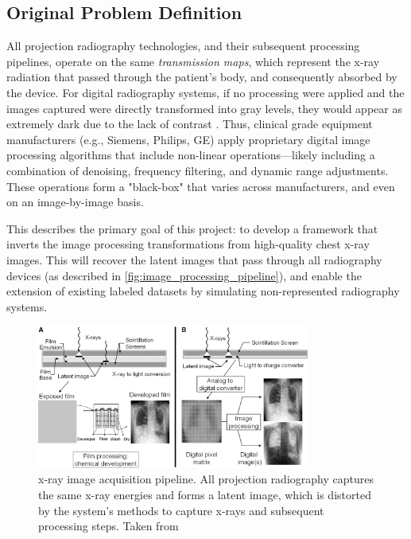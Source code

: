 \documentclass[nomenclature, english, bibtex]{kththesis}
\numberwithin{listing}{chapter}
\begin{document}
\subsection{Original Problem Definition}

All projection radiography technologies, and their subsequent processing pipelines, operate on the same
\textit{transmission maps}, which represent the x-ray radiation that passed through the patient's body, and consequently
absorbed by the device. For digital radiography systems, if no processing were applied and the images captured were directly transformed
into gray levels, they would appear as extremely dark due to the lack of contrast \cite[p.~148]{Prokop2003}.
Thus, clinical grade equipment manufacturers (e.g., Siemens, Philips, GE) apply proprietary digital image processing
algorithms that include non-linear operations—likely including a combination of denoising, frequency filtering,
and dynamic range adjustments. These operations form a "black-box" that varies across manufacturers, and even on an
image-by-image basis.

This describes the primary goal of this project: to develop a framework that inverts the image processing transformations
from high-quality chest x-ray images. This will recover the latent images that pass through all radiography devices (as
described in \autoref{fig:image_processing_pipeline}), and enable the extension of existing labeled datasets by simulating
non-represented radiography systems.

\begin{figure}
    \centering
    \includegraphics[width=0.8\textwidth]{figures/latent_image.jpg}
    \caption{x-ray image acquisition pipeline. All projection radiography captures the same x-ray energies and
   forms a latent image, which is distorted by the system's methods to capture x-rays and subsequent processing steps.
    Taken from \cite[p.~13]{Seibert3}}
    \label{fig:image_processing_pipeline}
\end{figure}
\end{document}
